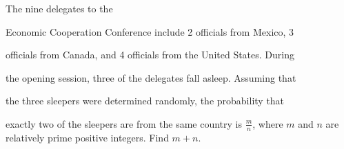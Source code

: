 The nine delegates to the 

Economic Cooperation Conference include 2 officials from Mexico, 3 

officials from Canada, and 4 officials from the United States. During 

the opening session, three of the delegates fall asleep. Assuming that 

the three sleepers were determined randomly, the probability that 

exactly two of the sleepers are from the same country is $\tfrac{m}{n}$,  where $m$ and $n$ are relatively prime positive integers. Find $m+n$.